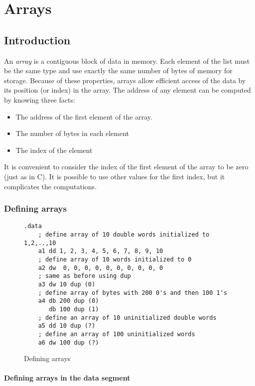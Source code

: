 \chapter{Arrays}
\section{Introduction}

An \emph{array} is a contiguous block of data in memory. Each element
of the list must be the same type and use exactly the same number of bytes
of memory for storage. Because of these properties, arrays allow efficient
access of the data by its position (or index) in the array. The address
of any element can be computed by knowing three facts:
\begin{itemize}
\item The address of the first element of the array.
\item The number of bytes in each element
\item The index of the element
\end{itemize}

It is convenient to consider the index of the first element of the array
to be zero (just as in C). It is possible to use other values for the
first index, but it complicates the computations.

\subsection{Defining arrays}

\begin{figure}[t]
\begin{lstlisting}[language={[x86masm]Assembler}]
.data
	; define array of 10 double words initialized to 1,2,..,10
	a1 dd 1, 2, 3, 4, 5, 6, 7, 8, 9, 10
	; define array of 10 words initialized to 0
	a2 dw  0, 0, 0, 0, 0, 0, 0, 0, 0, 0
	; same as before using dup
	a3 dw 10 dup (0)
	; define array of bytes with 200 0's and then 100 1's
	a4 db 200 dup (0)
	   db 100 dup (1)
	; define an array of 10 uninitialized double words
	a5 dd 10 dup (?)
	; define an array of 100 uninitialized words
	a6 dw 100 dup (?)
\end{lstlisting}
\caption{Defining arrays\label{fig:DataArrays}}
\end{figure}

\subsubsection{Defining arrays in the {\code data} segment
               }

